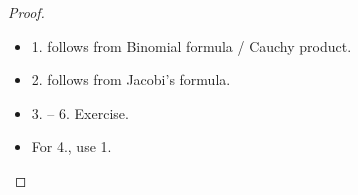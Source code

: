 \documentclass[twoside]{article}
\begin{document}
\begin{proof}
    \begin{itemize}
        \item 1. follows from Binomial formula / Cauchy product.
        \item 2. follows from Jacobi's formula.
        \item 3. -- 6. Exercise.
        \item For 4., use 1.
    \end{itemize}
\end{proof}













































\end{document}
